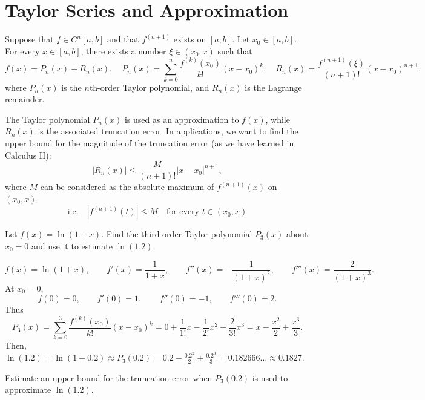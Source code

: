 \newpage

\section{Taylor Series and Approximation}

\begin{theorem}
Suppose that $f\in C^n[a,b]$ and that $f^{(n+1)}$ exists on $[a,b]$. Let $x_0\in[a,b]$. For every $x\in[a,b]$, there exists a number $\xi \in (x_0, x)$ such that
\[
  f(x)=P_n(x)+R_n(x), \quad
  P_n(x)=\sum_{k=0}^{n}\frac{f^{(k)}(x_0)}{k!}(x-x_0)^k, \quad
  R_n(x)=\frac{f^{(n+1)}(\xi)}{(n+1)!}(x-x_0)^{n+1}.
\]
where $P_n(x)$ is the $n$th-order Taylor polynomial, and $R_n(x)$ is the Lagrange remainder.
\end{theorem}

\bigskip

The Taylor polynomial $P_n(x)$ is used as an approximation to $f(x)$, while $R_n(x)$ is the associated truncation error. In applications, we want to find the upper bound for the magnitude of the truncation error (as we have learned in Calculus II):
\[
  |R_n(x)|\le
  \frac{M}{(n+1)!}|x-x_0|^{n+1},
\]
where $M$ can be considered as the absolute maximum of $f^{(n+1)}(x)$ on $(x_0, x)$.
\[
    \text{i.e.} \quad |f^{(n+1)}(t)|\le M \quad \text{for every } t \in (x_0, x)
\]

\begin{example}
Let $f(x)=\ln(1+x)$. Find the third-order Taylor polynomial $P_3(x)$ about $x_0=0$ and use it to estimate $\ln(1.2)$.
\end{example}

\begin{solution}[5.0cm]
\[
 f(x)=\ln(1+x), \qquad
 f'(x)=\frac1{1+x},\qquad
 f''(x)=-\frac1{(1+x)^2},\qquad
 f'''(x)=\frac2{(1+x)^3}.
\]
At $x_0=0$,
\[
 f(0)=0,\qquad f'(0)=1,\qquad f''(0)=-1,
 \qquad f'''(0)=2.
\]
Thus
\[
    P_3(x)=\sum_{k=0}^{3}{\frac{f^{(k)}(x_0)}{k!}(x-x_0)^k}=0+\frac{1}{1!}x-\frac{1}{2!}x^2+\frac{2}{3!}x^3=x-\frac{x^2}{2}+\frac{x^3}{3}.
\]
Then,
\(
 \ln(1.2) = \ln(1 + 0.2) \approx P_3(0.2)
 =0.2-\frac{0.2^2}{2}+\frac{0.2^3}{3}
 =0.182666\ldots\approx0.1827.
\)
\end{solution}

\medskip

\begin{example}
Estimate an upper bound for the truncation error when $P_3(0.2)$ is used to approximate $\ln(1.2)$.
\end{example}

